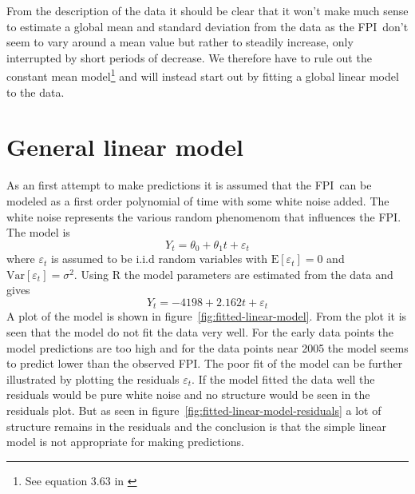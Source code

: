 \documentclass[11pt]{article}
\newcommand\fpi{FPI}
\newcommand\E[1]{\text{E}[#1]}
\newcommand\Var[1]{\text{Var}[#1]}
\begin{document}
From the description of the data it should be clear that it won't make much sense to estimate a global mean and standard deviation from the data as the \fpi\ don't seem to vary around a mean value but rather to steadily increase, only interrupted by short periods of decrease. We therefore have to rule out the constant mean model\footnote{See equation $3.63$ in \cite{hm}} and will instead start out by fitting a global linear model to the data.

\section*{General linear model}
As an first attempt to make predictions it is assumed that the \fpi\ can be modeled as a first order polynomial of time with some white noise added. The white noise represents the various random phenomenom that influences the \fpi. The model is
\begin{equation*}
    Y_t = \theta_0 + \theta_1 t + \varepsilon_t
\end{equation*}
where $\varepsilon_t$ is assumed to be i.i.d random variables with $\E{\varepsilon_t}=0$ and $\Var{\varepsilon_t}=\sigma^2$. Using R the model parameters are estimated from the data and gives 
\begin{equation*}
    Y_t = -4198 + 2.162 t + \varepsilon_t
\end{equation*}
A plot of the model is shown in figure~\ref{fig:fitted-linear-model}. From the plot it is seen that the model do not fit the data very well. For the early data points the model predictions are too high and for the data points near 2005 the model seems to predict lower than the observed \fpi. The poor fit of the model can be further illustrated by plotting the residuals $\varepsilon_t$. If the model fitted the data well the residuals would be pure white noise and no structure would be seen in the residuals plot. But as seen in figure~\ref{fig:fitted-linear-model-residuals} a lot of structure remains in the residuals and the conclusion is that the simple linear model is not appropriate for making predictions.
\end{document}
